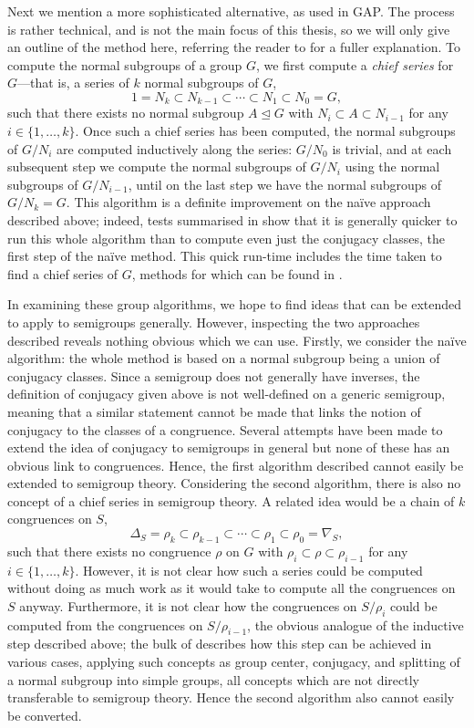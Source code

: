Next we mention a more sophisticated alternative, as used in GAP.  The process
is rather technical, and is not the main focus of this thesis, so we will only
give an outline of the method here, referring the reader to \cite{hulpke_1998}
for a fuller explanation.  To compute the normal subgroups of a group $G$, we
first compute a \textit{chief series} for $G$---that is, a series of $k$ normal
subgroups of $G$, 
$$1 = N_k
\subset N_{k-1}
\subset \cdots
\subset N_1
\subset N_0 = G,$$
such that there exists no normal subgroup $A \trianglelefteq G$ with
$N_i \subset A \subset N_{i-1}$ for any $i \in \{1, \ldots, k\}$.
Once such a chief series has been computed, the normal subgroups of $G / N_i$
are computed inductively along the series: $G / N_0$ is trivial, and at each
subsequent step we compute the normal subgroups of $G / N_i$ using the normal
subgroups of $G / N_{i-1}$, until on the last step we have the normal subgroups
of $G / N_k = G$.  This algorithm is a definite improvement on the na\"ive
approach described above; indeed, tests summarised in \cite[Table
1]{hulpke_1998} show that it is generally quicker to run this whole algorithm
than to compute even just the conjugacy classes, the first step of the na\"ive
method.  This quick run-time includes the time taken to find a chief series of
$G$, methods for which can be found in \cite{chief_series}.

In examining these group algorithms, we hope to find ideas that can be extended
to apply to semigroups generally.  However, inspecting the two approaches
described reveals nothing obvious which we can use.  Firstly, we consider the
na\"ive algorithm: the whole method is based on a normal subgroup being a union
of conjugacy classes.  Since a semigroup does not generally have inverses, the
definition of conjugacy given above is not well-defined on a generic semigroup,
meaning that a similar statement cannot be made that links the notion of
conjugacy to the classes of a congruence.  Several attempts have been made to
extend the idea of conjugacy to semigroups in general
\cite{conjugation_in_semigroups} but none of these has an obvious link to
congruences.  Hence, the first algorithm described cannot easily be extended to
semigroup theory.  Considering the second algorithm, there is also no concept of
a chief series in semigroup theory.  A related idea would be a chain of $k$
congruences on $S$,
$$\Delta_S = \rho_k
\subset \rho_{k-1}
\subset \cdots
\subset \rho_1
\subset \rho_0 = \nabla_S,$$
such that there exists no congruence $\rho$ on $G$ with
$\rho_i \subset \rho \subset \rho_{i-1}$ for any $i \in \{1, \ldots, k\}$.
However, it is not clear how such a series could be computed without doing as
much work as it would take to compute all the congruences on $S$ anyway.
Furthermore, it is not clear how the congruences on $S / \rho_i$ could be
computed from the congruences on $S / \rho_{i-1}$, the obvious analogue of the
inductive step described above; the bulk of \cite{hulpke_1998} describes how
this step can be achieved in various cases, applying such concepts as group
center, conjugacy, and splitting of a normal subgroup into simple groups, all
concepts which are not directly transferable to semigroup theory.  Hence the
second algorithm also cannot easily be converted.

